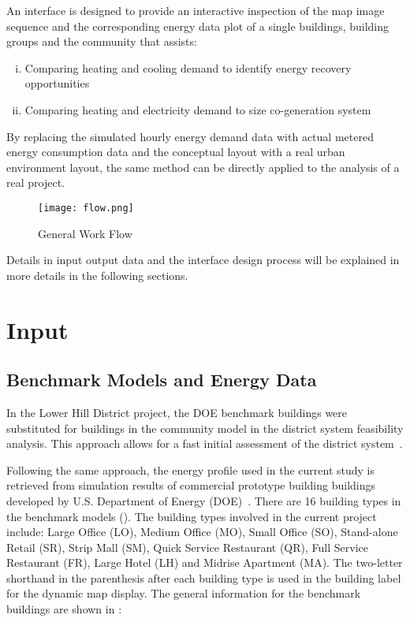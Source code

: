 An interface is designed to provide an interactive inspection of the
map image sequence and the corresponding energy data plot of a single
buildings, building groups and the community that assists:
\begin{enumerate}[i.]
\item Comparing heating and cooling demand to identify energy recovery
  opportunities
\item Comparing heating and electricity demand to size co-generation
  system
\end{enumerate}

By replacing the simulated hourly energy demand data with actual
metered energy consumption data and the conceptual layout with a real
urban environment layout, the same method can be directly applied to
the analysis of a real project.

\begin{figure}[h!]
  \centering
  \texttt{[image: flow.png]}
  \caption[General Work Flow]{General Work Flow}
  \label{fig:flow}
\end{figure}

Details in input output data and the interface design process will be
explained in more details in the following sections.
\newpage
\section{Input}
\subsection{Benchmark Models and Energy Data}
In the Lower Hill District project, the DOE benchmark buildings were
substituted for buildings in the community model in the district
system feasibility analysis. This approach allows for a fast initial
assessment of the district system~\cite{baird2014}.

Following the same approach, the energy profile used in the current
study is retrieved from simulation results of commercial prototype
building buildings developed by U.S. Department of Energy
(DOE)~\cite{DOEprototype}. There are 16 building types in the benchmark
models (). The building types involved in the
current project include: Large Office (LO), Medium Office (MO), Small
Office (SO), Stand-alone Retail (SR), Strip Mall (SM), Quick Service
Restaurant (QR), Full Service Restaurant (FR), Large Hotel (LH) and
Midrise Apartment (MA). The two-letter shorthand in the parenthesis
after each building type is used in the building label for the dynamic
map display. The general information for the benchmark buildings are
shown in :

